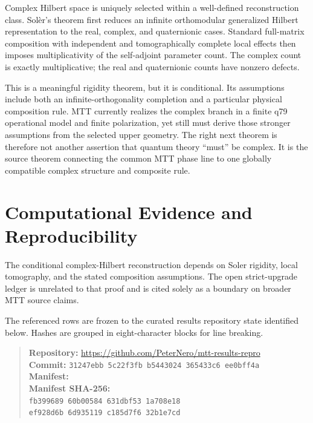 \documentclass[11pt]{article}
\begin{document}
Complex Hilbert space is uniquely selected within a well-defined reconstruction class. Sol\`er's theorem first reduces an infinite orthomodular generalized Hilbert representation to the real, complex, and quaternionic cases. Standard full-matrix composition with independent and tomographically complete local effects then imposes multiplicativity of the self-adjoint parameter count. The complex count is exactly multiplicative; the real and quaternionic counts have nonzero defects.

This is a meaningful rigidity theorem, but it is conditional. Its assumptions include both an infinite-orthogonality completion and a particular physical composition rule. MTT currently realizes the complex branch in a finite q79 operational model and finite polarization, yet still must derive those stronger assumptions from the selected upper geometry. The right next theorem is therefore not another assertion that quantum theory ``must'' be complex. It is the source theorem connecting the common MTT phase line to one globally compatible complex structure and composite rule.



\section*{Computational Evidence and Reproducibility}
The conditional complex-Hilbert reconstruction depends on Soler rigidity, local tomography, and the stated composition assumptions. The open strict-upgrade ledger is unrelated to that proof and is cited solely as a boundary on broader MTT source claims.

The referenced rows are frozen to the curated results repository state identified below. Hashes are grouped in eight-character blocks for line breaking.
\begin{quote}\small
\textbf{Repository:} \url{https://github.com/PeterNero/mtt-results-repro}\\
\textbf{Commit:} \texttt{31247ebb 5c22f3fb b5443024 365433c6 ee0bff4a}\\
\textbf{Manifest:} \\
\textbf{Manifest SHA-256:}\\
\texttt{fb399689 60b00584 631dbf53 1a708e18}\\
\texttt{ef928d6b 6d935119 c185d7f6 32b1e7cd}
\end{quote}
\end{document}
